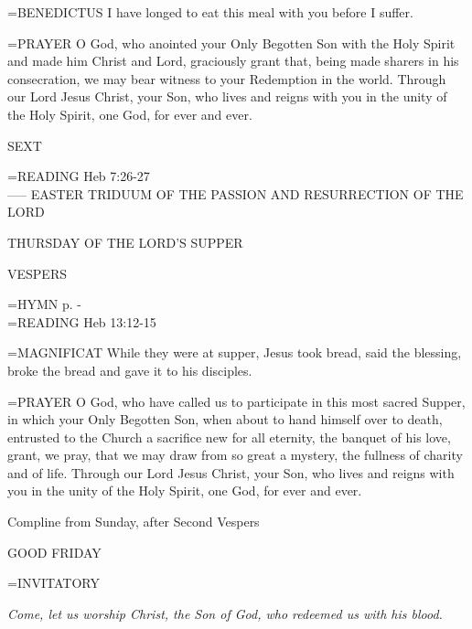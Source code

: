 \hangindent=\parindent \small{BENEDICTUS 	I have longed to eat this meal with you before I suffer.\\}

\hangindent=\parindent \small{PRAYER 	O God, who anointed your Only Begotten Son with the Holy Spirit and made him Christ and Lord, graciously grant that, being made sharers in his consecration, we may bear witness to your Redemption in the world. Through our Lord Jesus Christ, your Son, who lives and reigns with you in the unity of the Holy Spirit, one God, for ever and ever.}

\begin{flushleft}\normalsize SEXT\\\end{flushleft}
\hangindent=\parindent \small{\uppercase{READING}}    Heb 7:26-27 \textbf{   \\}
-----
EASTER TRIDUUM
OF THE PASSION AND RESURRECTION
OF THE LORD

THURSDAY OF THE LORD'S SUPPER

\begin{flushleft}\normalsize VESPERS\\\end{flushleft}
\hangindent=\parindent \small{\uppercase{HYMN} p. \pageref{lent:firstHymn}-\pageref{lent:lastHymn}\\}
\hangindent=\parindent \small{\uppercase{READING}}    Heb 13:12-15 \textbf{   \\}

\hangindent=\parindent \small{MAGNIFICAT 	While they were at supper, Jesus took bread, said the blessing, broke the bread and gave it to his disciples.\\}

\hangindent=\parindent \small{PRAYER 	O God, who have called us to participate in this most sacred Supper, in which your Only Begotten Son, when about to hand himself over to death, entrusted to the Church a sacrifice new for all eternity, the banquet of his love, grant, we pray, that we may draw from so great a mystery, the fullness of charity and of life. Through our Lord Jesus Christ, your Son, who lives and reigns with you in the unity of the Holy Spirit, one God, for ever and ever.}

Compline from Sunday, after Second Vespers

GOOD FRIDAY

\hangindent=\parindent \small{INVITATORY}
\begin{center}
\textit{Come, let us worship Christ, the Son of God, who redeemed us with his blood.\\}
\end{center}

